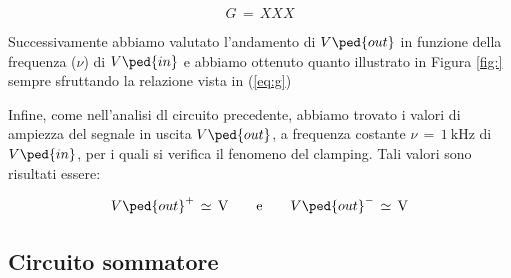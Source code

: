\begin{equation}
        G\,=\, XXX
\end{equation}

Successivamente abbiamo valutato l'andamento di $V\ped{out}$ in funzione della frequenza ($\nu$) di $V\ped{in}$ e abbiamo ottenuto quanto illustrato in Figura \ref{fig:} sempre sfruttando la relazione vista in (\ref{eq:g})

Infine, come nell'analisi dl circuito precedente, abbiamo trovato i valori di ampiezza del segnale in uscita $V\ped{out}$, a frequenza costante $\nu\,=\,\SI{1}{\kilo\hertz}$ di $V\ped{in}$, per i quali si verifica il fenomeno del clamping. Tali valori sono risultati essere:

\begin{equation}
        V\ped{out}^+\,\simeq\,\SI{}{\volt} \qquad \text{e} \qquad V\ped{out}^-\,\simeq\,\SI{}{\volt}
\end{equation}

\subsection*{Circuito sommatore}
















